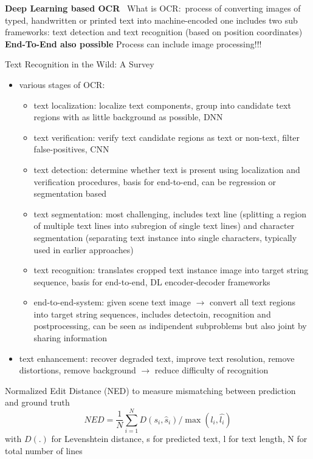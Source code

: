 \textbf{Deep Learning based OCR}~\citep{zhao_improving_2020}
What is OCR:\ process of converting images of typed, handwritten or printed text into machine-encoded one
includes two sub frameworks: text detection and text recognition (based on position coordinates)
\textbf{End-To-End also possible}
Process can include image processing!!!

Text Recognition in the Wild: A Survey~\citep{chen_text_2021}
\begin{itemize}
    \item various stages of \ac{OCR}:
        \begin{itemize}
            \item text localization: localize text components, group into candidate text regions with
                as little background as possible, DNN
            \item text verification: verify text candidate regions as text or non-text,
                filter false-positives, CNN
            \item text detection: determine whether text is present using localization and verification
                procedures, basis for end-to-end, can be regression or segmentation based
            \item text segmentation: most challenging, includes text line (splitting a region of multiple
                text lines into subregion of single text lines) and character segmentation (separating
                text instance into single characters, typically used in earlier approaches)
            \item text recognition: translates cropped text instance image into target string sequence,
                basis for end-to-end, DL encoder-decoder frameworks
            \item end-to-end-system: given scene text image $\rightarrow$ convert all text regions into
                target string sequences, includes detectoin, recognition and postprocessing, can be
                seen as indipendent subproblems but also joint by sharing information
        \end{itemize}
    \item text enhancement: recover degraded text, improve text resolution, remove distortions,
        remove background $\rightarrow$ reduce difficulty of recognition
\end{itemize}

Normalized Edit Distance (NED) to measure mismatching between prediction and ground truth
\[NED = \frac{1}{N}\sum_{i=1}^N D(s_i,\hat{s}_i)/\max(l_i,\hat{l_i})\]
with $D(.)$ for Levenshtein distance, s for predicted text, l for text length, N for total number of lines

